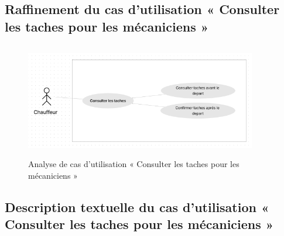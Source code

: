 
\newpage
\subsection{Raffinement du cas d'utilisation « Consulter les taches pour les mécaniciens »}
\begin{figure}[h!]
  \centering
  \includegraphics[width=0.9\textwidth,height=5cm]{chap4.images/raf consulter mec.png}
  \caption{Analyse de cas d’utilisation « Consulter les taches pour les mécaniciens »}

\end{figure}

\subsection{Description textuelle du cas d’utilisation « Consulter les taches pour les mécaniciens »}

